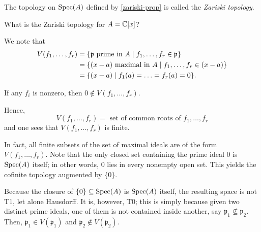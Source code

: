 \begin{df}
  The topology on $\text{Spec}(A)$ defined by \cref{zariski-prop} is called the \textit{Zariski topology}.
\end{df}

\begin{question}
What is the Zariski topology for $A = \mathbb C [x]$?
\end{question}

\begin{answer}
We note that
\begin{align*}
  V(f_1, \ldots, f_r) & = \{ \mathfrak p \text{ prime in } A \mathrel{|} f_1, \dotsc, f_r \in \mathfrak p\} \\
                      & = \{(x-a) \text{ maximal in } A \mathrel{|} f_1, \dotsc, f_r \in (x-a)\} \\
                      & = \{ (x-a) \mathrel{|} f_1(a) = \dotsc = f_r(a) = 0 \}.
\end{align*}

If any $f_i$ is nonzero, then $0 \notin V(f_1, \dotsc, f_r)$.

Hence,
\[ V(f_1, \ldots, f_r) = \text{ set of common roots of }f_1, \ldots, f_r \]
and one sees that $V(f_1, \ldots, f_r)$ is finite.

In fact, all finite subsets of the set of maximal ideals are of the form $V(f_1, \ldots, f_r)$. Note that the only closed set containing the prime ideal $0$ is $\text{Spec}(A)$ itself; in other words, $0$ lies in every nonempty open set. This yields the cofinite topology augmented by $\{0\}$.
\end{answer}

\begin{note}
  Because the closure of $\{0\} \subseteq \text{Spec}(A)$ is $\text{Spec}(A)$ itself, the resulting space is not T1, let alone Hausdorff. It is, however, T0; this is simply because given two distinct prime ideals, one of them is not contained inside another, say \(\mathfrak{p}_1 \not\subseteq \mathfrak{p}_2.\) Then, \(\mathfrak{p}_1 \in V(\mathfrak{p}_1)\) and \(\mathfrak{p}_2 \notin V(\mathfrak{p}_2).\)
\end{note}

